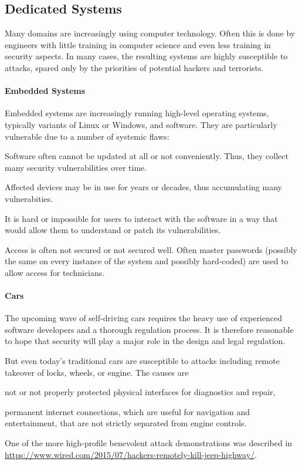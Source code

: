 \subsection{Dedicated Systems}

Many domains are increasingly using computer technology.
Often this is done by engineers with little training in computer science and even less training in security aspects.
In many cases, the resulting systems are highly susceptible to attacks, spared only by the priorities of potential hackers and terrorists.

\paragraph{Embedded Systems}
Embedded systems are increasingly running high-level operating systems, typically variants of Linux or Windows, and software.
They are particularly vulnerable due to a number of systemic flaws:
\begin{compactitem}
\item Software often cannot be updated at all or not conveniently. Thus, they collect many security vulnerabilities over time.
\item Affected devices may be in use for years or decades, thus accumulating many vulnerabities.
\item It is hard or impossible for users to interact with the software in a way that would allow them to understand or patch its vulnerabilities.
\item Access is often not secured or not secured well.
Often master passwords (possibly the same on every instance of the system and possibly hard-coded) are used to allow access for technicians.
\end{compactitem}

\paragraph{Cars}
The upcoming wave of self-driving cars requires the heavy use of experienced software developers and a thorough regulation process.
It is therefore reasonable to hope that security will play a major role in the design and legal regulation.

But even today's traditional cars are susceptible to attacks including remote takeover of locks, wheels, or engine.
The causes are
\begin{compactitem}
 \item not or not properly protected physical interfaces for diagnostics and repair,
 \item permanent internet connections, which are useful for navigation and entertainment, that are not strictly separated from engine controls.
\end{compactitem}
One of the more high-profile benevolent attack demonstrations was described in \url{https://www.wired.com/2015/07/hackers-remotely-kill-jeep-highway/}.

